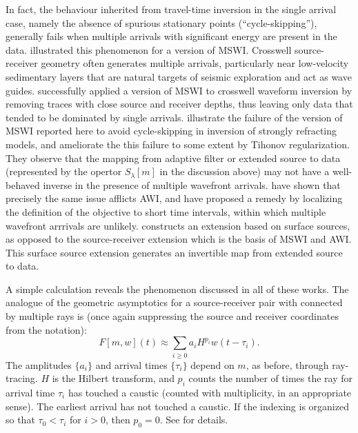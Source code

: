 In fact, the behaviour inherited from travel-time inversion in the
single arrival case, namely the absence of spurious stationary points
(``cycle-skipping''), generally fails when multiple arrivals with
significant energy are present in the data. \cite{Symes:94c}
illustrated this phenomenon for a version of MSWI. Crosswell
source-receiver geometry often generates multiple arrivals,
particularly near low-velocity sedimentary layers that are natural
targets of seismic exploration and act as wave
guides. \cite{Plessix:00} successfully applied a version of MSWI to
crosswell waveform inversion by removing traces with close source and
receiver depths, thus leaving only data that tended to be dominated by
single arrivals. \cite{HuangSymes:Geo17} illustrate the failure of the
version of MSWI reported here to avoid cycle-skipping in inversion of
strongly refracting models, and ameliorate the this failure to some
extent by Tihonov regularization. They observe that the mapping from
adaptive filter or extended source to data (represented by the opertor
$S_{\lambda}[m]$ in the discussion above) may not have a well-behaved inverse in
the presence of multiple wavefront arrivals. \cite{Yongetal:GJI23}
have shown that precisely the same issue afflicts AWI, and have
proposed a remedy by localizing the definition of the objective to
short time intervals, within which multiple wavefront arrrivals are
unlikely. \cite{Symes:23} constructs an extension based on surface
sources, as opposed to the source-receiver extension which is the
basis of MSWI and AWI. This surface source extension generates an
invertible map from extended source to data.

A simple calculation reveals the phenomenon discussed in all of these
works. The analogue of the geometric asymptotics for a source-receiver
pair with connected by multiple rays is (once again suppressing the
source and receiver coordinates from the notation):
\begin{equation}
  \label{eqn:multi}
  F[m,w](t) \approx \sum_{i \ge 0} a_i H^{p_i}w(t-\tau_i).
\end{equation}
The amplitudes $\{a_i\}$ and arrival times $\{\tau_i\}$ depend on $m$, as
before, through ray-tracing. $H$ is the Hilbert transform, and $p_i$
counts the number of times the ray for arrival time $\tau_i$ has
touched a caustic (counted with multiplicity, in an appropriate
sense). The earliest arrival has not touched a caustic. If the
indexing is organized so that $\tau_0 < \tau_i$ for $i>0$, then
$p_0=0$. See \cite{Friedlander:75} for details.

